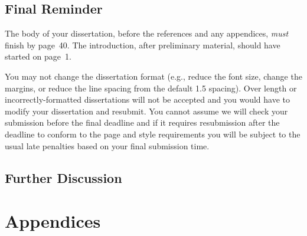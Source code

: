 \documentclass[msc,deptreport]{infthesis} %
\begin{document}
\section{Final Reminder}

The body of your dissertation, before the references and any appendices,
\emph{must} finish by page~40. The introduction, after preliminary material,
should have started on page~1.

You may not change the dissertation format (e.g., reduce the font
size, change the margins, or reduce the line spacing from the default
1.5 spacing). Over length or incorrectly-formatted dissertations will
not be accepted and you would have to modify your dissertation and
resubmit.  You cannot assume we will check your submission before the
final deadline and if it requires resubmission after the deadline to
conform to the page and style requirements you will be subject to the
usual late penalties based on your final submission time.

\section{Further Discussion}
\label{sec5.1:discusstion}





\chapter*{Appendices}

% 
% 
% 
\end{document}
